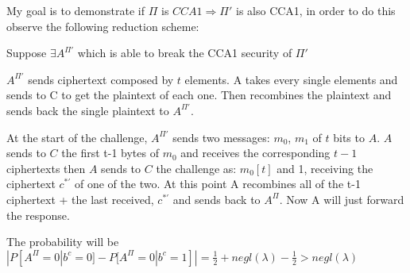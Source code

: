 My goal is to demonstrate if $\Pi$ is $CCA1 \Rightarrow \Pi'$ is also CCA1, in order to do this observe the following reduction scheme:

Suppose $\exists A^{\Pi'}$ which is able to break the CCA1 security of $\Pi'$
\begin{figure}[h!]
    \centering
    \sdinit{}
\end{figure}


$A^{\Pi'}$ sends ciphertext composed by $t$ elements. A takes every single elements and sends to C to get the plaintext of each one.
Then recombines the plaintext and sends back the single plaintext to $A^{\Pi'}$.

At the start of the challenge, $A^{\Pi'}$ sends two messages: $m_0$, $m_1$ of $t$ bits to $A$.
$A$ sends to $C$ the first t-1 bytes of $m_0$ and receives the corresponding $t-1$ ciphertexts then $A$ sends to $C$ the challenge as: $m_0[t]$ and 1, receiving the ciphertext $c^{*\prime}$ of one of the two.
At this point A recombines all of the t-1 ciphertext + the last received, $c^{*\prime}$ and sends back to $A^{\Pi}$.
Now A will just forward the response.

The probability will be $|P[A^{\Pi}=0 | b^c=0]-P[A^{\Pi}=0 | b^c=1]|=\frac{1}{2}+negl(\lambda)-\frac{1}{2}>negl(\lambda)$ 

